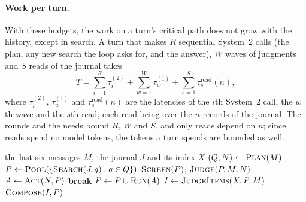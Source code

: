 \paragraph{Work per turn.}
With these budgets, the work on a turn's critical path does not grow with the history, except in search.
A turn that makes $R$ sequential System~2 calls (the plan, any new search the loop asks for, and the answer), $W$ waves of judgments and $S$ reads of the journal takes
\begin{equation}
\label{eq:work}
T = \sum_{i=1}^{R} \tau^{(2)}_i + \sum_{w=1}^{W} \tau^{(1)}_w + \sum_{s=1}^{S} \tau^{\mathrm{read}}_s(n),
\end{equation}
where $\tau^{(2)}_i$, $\tau^{(1)}_w$ and $\tau^{\mathrm{read}}_s(n)$ are the latencies of the $i$th System~2 call, the $w$th wave and the $s$th read, each read being over the $n$ records of the journal.
The rounds and the needs bound $R$, $W$ and $S$, and only reads depend on $n$; since reads spend no model tokens, the tokens a turn spends are bounded as well.

\begin{algorithm}[t]
\caption{One user turn of \sys.}
\label{alg:turn}
\small
\begin{algorithmic}[1]
\Require the last six messages $M$, the journal $J$ and its index $X$
\State $(Q, N) \gets \textsc{Plan}(M)$ 
\State $P \gets \textsc{Pool}(\{\textsc{Search}(J, q) : q \in Q\})$ 
  \State $\textsc{Screen}(P)$;\; $\textsc{Judge}(P, M, N)$ 
  \State $A \gets \textsc{Act}(N, P)$ 
   \State \textbf{break} \EndIf
  \State $P \gets P \cup \textsc{Run}(A)$
\EndFor
\State $I \gets \textsc{JudgeItems}(X, P, M)$ 
\State \Return $\textsc{Compose}(I, P)$ 
\end{algorithmic}
\end{algorithm}
